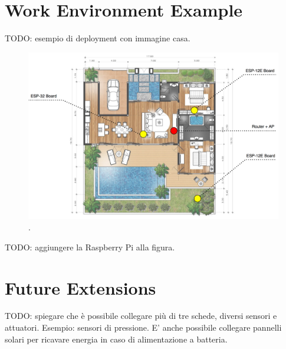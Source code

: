 \section{Work Environment Example}
TODO: esempio di deployment con immagine casa.

\begin{figure}[H]
	\begin{center}
		\includegraphics[width=\textwidth]{./pictures/blueprint_deployment.png}
		\caption{.}
		\label{blueprint_deployment}
	\end{center}
\end{figure}

TODO: aggiungere la Raspberry Pi alla figura.

\section{Future Extensions}
TODO: spiegare che è possibile collegare più di tre schede, diversi sensori e attuatori. Esempio: sensori di pressione. E' anche possibile collegare pannelli solari per ricavare energia in caso di alimentazione a batteria.